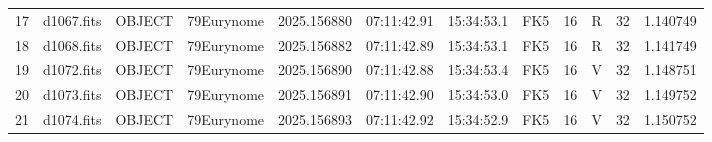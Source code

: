 \begin{tabular}{llllrlllllll}
17 & d1067.fits & OBJECT & 79Eurynome & 2025.156880 & 07:11:42.91 & 15:34:53.1 & FK5 & 16 & R & 32 & 1.140749 \\
18 & d1068.fits & OBJECT & 79Eurynome & 2025.156882 & 07:11:42.89 & 15:34:53.1 & FK5 & 16 & R & 32 & 1.141749 \\
19 & d1072.fits & OBJECT & 79Eurynome & 2025.156890 & 07:11:42.88 & 15:34:53.4 & FK5 & 16 & V & 32 & 1.148751 \\
20 & d1073.fits & OBJECT & 79Eurynome & 2025.156891 & 07:11:42.90 & 15:34:53.0 & FK5 & 16 & V & 32 & 1.149752 \\
21 & d1074.fits & OBJECT & 79Eurynome & 2025.156893 & 07:11:42.92 & 15:34:52.9 & FK5 & 16 & V & 32 & 1.150752 \\
\end{tabular}
